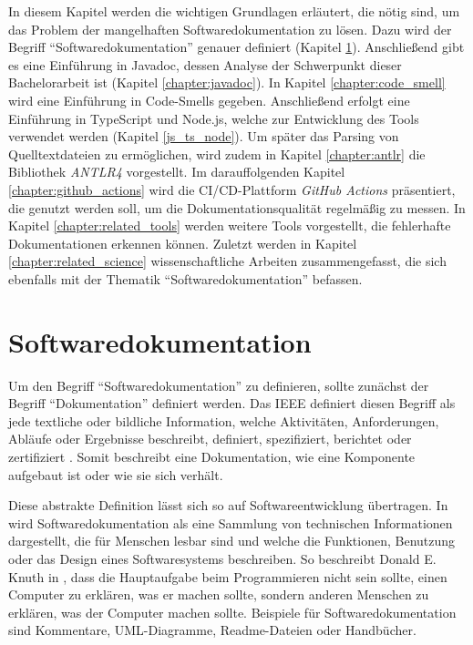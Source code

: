 In diesem Kapitel werden die wichtigen Grundlagen erläutert, die nötig sind, um das Problem der mangelhaften Softwaredokumentation zu lösen.  Dazu  wird der Begriff \enquote{Softwaredokumentation} genauer definiert (Kapitel \ref{chapter:documentation}). Anschließend gibt es eine Einführung in Javadoc, dessen Analyse der Schwerpunkt dieser Bachelorarbeit ist (Kapitel \ref{chapter:javadoc}). In Kapitel \ref{chapter:code_smell} wird eine Einführung in Code-Smells gegeben. Anschließend erfolgt eine Einführung in TypeScript und Node.js, welche zur Entwicklung des Tools verwendet werden (Kapitel \ref{js_ts_node}). Um später das Parsing von Quelltextdateien zu ermöglichen, wird zudem in Kapitel \ref{chapter:antlr} die Bibliothek \textit{ANTLR4} vorgestellt. Im darauffolgenden Kapitel \ref{chapter:github_actions} wird die \ac{CI/CD}-Plattform \textit{GitHub Actions} präsentiert, die genutzt werden soll, um die Dokumentationsqualität regelmäßig zu messen. In Kapitel \ref{chapter:related_tools} werden weitere Tools vorgestellt, die fehlerhafte Dokumentationen erkennen können. Zuletzt werden in Kapitel \ref{chapter:related_science} wissenschaftliche Arbeiten zusammengefasst, die sich ebenfalls mit der Thematik \enquote{Softwaredokumentation} befassen. 
 

\hfill
\section{Softwaredokumentation}\label{chapter:documentation}
Um den Begriff \enquote{Softwaredokumentation} zu definieren, sollte zunächst der Begriff \enquote{Dokumentation} definiert werden. Das IEEE  definiert diesen Begriff als jede textliche oder bildliche Information, welche Aktivitäten, Anforderungen, Abläufe oder Ergebnisse beschreibt, definiert, spezifiziert, berichtet oder zertifiziert \cite[S.~28]{IEEEStandardGlossaryofSoftwareEngineeringTerminology}. Somit beschreibt eine Dokumentation, wie eine Komponente aufgebaut ist oder wie sie sich verhält.

Diese abstrakte Definition lässt sich so auf Softwareentwicklung übertragen. In \cite[S.~125]{Softwaredocumentationandstandards} wird Softwaredokumentation als eine Sammlung von technischen Informationen dargestellt, die für Menschen lesbar sind und welche die Funktionen, Benutzung oder das Design eines Softwaresystems beschreiben. So beschreibt Donald E. Knuth in \cite[S.~97]{LiterateProgramming}, dass die Hauptaufgabe beim Programmieren nicht sein sollte, einen Computer zu erklären, was er machen sollte, sondern anderen Menschen zu erklären, was der Computer machen sollte. Beispiele für Softwaredokumentation sind Kommentare,  UML-Diagramme, Readme-Dateien oder Handbücher.

